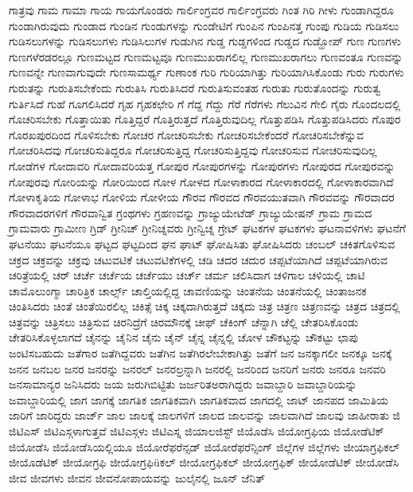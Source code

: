 {ಗಾತ್ರವು
ಗಾಮ
ಗಾಮಾ
ಗಾಯ
ಗಾಯಗೊಂಡರು
ಗಾರ್ಲಿಂಗ್ರವರ
ಗಾರ್ಲಿಂಗ್ರವರು
ಗಿಂತ
ಗಿರಿ
ಗೀಳು
ಗುಂಡಾಗಿದ್ದರೂ
ಗುಂಡಾಗಿರುವುದು
ಗುಂಡಾದ
ಗುಂಡಿನ
ಗುಂಡುಗಳನ್ನು
ಗುಂಡೇಟಿಗೆ
ಗುಂಪಿನ
ಗುಂಪಿನತ್ತ
ಗುಂಪು
ಗುಡಿಯ
ಗುಡಿಸಲು
ಗುಡಿಸಲುಗಳನ್ನು
ಗುಡಿಸಲುಗಳು
ಗುಡಿಸಿಲುಗಳ
ಗುಡುಗಿನ
ಗುಡ್ಡ
ಗುಡ್ಡಗಳಿಂದ
ಗುಡ್ಡದ
ಗುಡ್ಹೋಪ್
ಗುಣ
ಗುಣಗಳು
ಗುಣಗಳೆರಡರಲ್ಲೂ
ಗುಣಮಟ್ಟದ
ಗುಣಮಟ್ಟವೂ
ಗುಣಮುಖರಾಗಲಿಲ್ಲ
ಗುಣಮುಖರಾಗಲು
ಗುಣವಂತೂ
ಗುಣವನ್ನು
ಗುಣವನ್ನೇ
ಗುಣವಾಗುವುದೇ
ಗುಣಸಾಮರ್ಥ್ಯ
ಗುಣಾಂಕ
ಗುರಿ
ಗುರಿಯಾಗಿತ್ತು
ಗುರಿಯಾಗಿಸಿಕೊಂಡು
ಗುರು
ಗುರುಗಳು
ಗುರುತನ್ನು
ಗುರುತಿಸಬೇಕೆಂದು
ಗುರುತಿಸಿ
ಗುರುತಿಸಿದರೆ
ಗುರುತಿಸುವಂತಹ
ಗುರುತು
ಗುರುತೊಂದನ್ನು
ಗುರುತ್ವ
ಗುರ್ತಿಸಿದೆ
ಗುಹೆ
ಗೂಗಲಿಸಿದರೆ
ಗೃಹ
ಗೃಹಕಛೇರಿ
ಗೆ
ಗೆದ್ದ
ಗೆದ್ದು
ಗೆರೆ
ಗೆರೆಗಳು
ಗೆಲುವಿನ
ಗೇಲಿ
ಗೈರು
ಗೊಂದಲದಲ್ಲಿ
ಗೊಚರಿಸಬೇಕು
ಗೊತ್ತಾಯಿತು
ಗೊತ್ತಿದ್ದರೆ
ಗೊತ್ತಿರುತ್ತದೆ
ಗೊತ್ತಿರುವುದಿಲ್ಲ
ಗೊತ್ತುಪಡಿಸಿ
ಗೊತ್ತುಪಡಿಸಿದರು
ಗೊಪುರ
ಗೊರಖಪುರದಿಂದ
ಗೊಳಿಸಬೇಕು
ಗೋಚರ
ಗೋಚರಿಸಬೇಕು
ಗೋಚರಿಸಬೇಕೆಂದರೆ
ಗೋಚರಿಸಬೇಕೆನ್ನುವ
ಗೋಚರಿಸಿದವು
ಗೋಚರಿಸುತಿದ್ದರೂ
ಗೋಚರಿಸುತ್ತಿದ್ದ
ಗೋಚರಿಸುತ್ತಿದ್ದವು
ಗೋಚರಿಸುವ
ಗೋಚರಿಸುವುದಿಲ್ಲ
ಗೋಡೆಗಳ
ಗೋದಾವರಿ
ಗೋದಾವರಿಯತ್ತ
ಗೋಪುರ
ಗೋಪುರಗಳನ್ನು
ಗೋಪುರಗಳು
ಗೋಪುರದ
ಗೋಪುರವನ್ನು
ಗೋಪುರವು
ಗೋರಿಯನ್ನು
ಗೋರಿಯಿಂದ
ಗೋಳ
ಗೋಳದ
ಗೋಳಾಕಾರದ
ಗೋಳಾಕಾರದಲ್ಲಿ
ಗೋಳಾಕಾರವಾಗಿದೆ
ಗೋಳಾಕೃತಿಯ
ಗೋಳಾಭ
ಗೋಳಿಯ
ಗೋಳೀಯ
ಗೌರವ
ಗೌರವದ
ಗೌರವಯುತವಾಗಿ
ಗೌರವವನ್ನು
ಗೌರವಾದರ
ಗೌರವಾದರಗಳಿಗೆ
ಗೌರವಾನ್ವಿತ
ಗ್ರಂಥಗಳು
ಗ್ರಹಣವನ್ನು
ಗ್ರಾಜ್ಯುಯೇಟೆಡ್
ಗ್ರಾಜ್ಯುಯೇಷನ್
ಗ್ರಾಮ
ಗ್ರಾಮದ
ಗ್ರಾಮವಾರು
ಗ್ರಾಮೀಣ
ಗ್ರಿಡ್
ಗ್ರೀನಿಚ್
ಗ್ರೀನಿಚ್ನವರು
ಗ್ರೀನ್ವಿಚ್ನ
ಗ್ರೇಟ್
ಘಟಕಗಳ
ಘಟಕಗಳು
ಘಟನಾವಳಿಗಳು
ಘಟನೆಗೆ
ಘಟನೆಯು
ಘಟನೆಯೂ
ಘಟ್ಟದ
ಘಟ್ಟದಿಂದ
ಘನ
ಘಾಟ್
ಘೋಷಿಸಿತು
ಘೋಷಿಸಿದರು
ಚಂಬಲ್
ಚಕಿತಗೊಳಿಸುವ
ಚಕ್ರದ
ಚಕ್ರವನ್ನು
ಚಕ್ರವು
ಚಟುವಟಿಕೆ
ಚಟುವಟಿಕೆಗಳಲ್ಲಿ
ಚಡಿ
ಚದರ
ಚದುರ
ಚಪ್ಪಟೆಯಾಗಿದೆ
ಚಪ್ಪಟೆಯಾಗಿರುವ
ಚರಿತ್ರೆಯಲ್ಲಿ
ಚರ್
ಚರ್ಚೆ
ಚರ್ಚೆಯ
ಚರ್ಚೆಯು
ಚರ್ಚ್
ಚರ್ಮ
ಚಲಿಸಿದಾಗ
ಚಳಿಗಾಲ
ಚಳಿಯಲ್ಲಿ
ಚಾಟಿ
ಚಾಮೊಲುಂಗ್ಮಾ
ಚಾರಿತ್ರಿಕ
ಚಾರ್ಲ್ಸ್
ಚಾಲ್ತಿಯಲ್ಲಿದ್ದ
ಚಾವಣಿಯನ್ನು
ಚಿಂತನೆಯ
ಚಿಂತನೆಯಲ್ಲಿ
ಚಿಂತಾಜನಕ
ಚಿಂತಿಸಿದರು
ಚಿಂತೆ
ಚಿಂತೆಯಿರಲಿಲ್ಲ
ಚಿಕಿತ್ಸೆ
ಚಿಕ್ಕ
ಚಿಕ್ಕದಾಗಿರುತ್ತದೆ
ಚಿಕ್ಕದು
ಚಿತ್ರ
ಚಿತ್ರಣ
ಚಿತ್ರಣವನ್ನು
ಚಿತ್ರದ
ಚಿತ್ರದಲ್ಲಿ
ಚಿತ್ರವನ್ನು
ಚಿತ್ರಿಸಲು
ಚಿತ್ರಿಸುವ
ಚಿರನಿದ್ರೆಗೆ
ಚಿರಮೌನಕ್ಕೆ
ಚೀಫ್
ಚೆಕಿಂಗ್
ಚೆನ್ನಾಗಿ
ಚೆಲ್ಲಿ
ಚೇತರಿಸಿಕೊಂಡು
ಚೇತರಿಸಿಕೊಳ್ಳಲಾಗದೆ
ಚೈನನ್ನು
ಚೈನಿನ
ಚೈನು
ಚೈನ್
ಚೈನ್ನ
ಚೈನ್ನಲ್ಲಿ
ಚೋಳ
ಚೌಕಟ್ಟನ್ನು
ಚೌಕಟ್ಟು
ಛಾಪು
ಜಂಟಿಸಬಹುದು
ಜತೆಗಾರ
ಜತೆಗಿದ್ದವರು
ಜತೆಗಿನ
ಜತೆಗಿರಲೇಬೇಕಾಗಿತ್ತು
ಜತೆಗೆ
ಜನ
ಜನಕ್ಕಾಗಲೀ
ಜನಕ್ಕೂ
ಜನಕ್ಕೆ
ಜನನ
ಜನಬಲ
ಜನರ
ಜನರನ್ನು
ಜನರಲ್
ಜನರಲ್ರನ್ನಾಗಿ
ಜನರಲ್ಲಿ
ಜನರಿಂದ
ಜನರಿಗೆ
ಜನರು
ಜನರೂ
ಜನವರಿ
ಜನಸಾಮಾನ್ಯರ
ಜನಿಸಿದರು
ಜಯ
ಜರುಗಿಬಿಟ್ಟಿತು
ಜರ್ಜರಿತಅರಾಗಿದ್ದರು
ಜವಾಬ್ದಾರಿ
ಜವಾಬ್ದಾರಿಯನ್ನು
ಜವಾಬ್ದಾರಿಯಲ್ಲಿ
ಜಾಗ
ಜಾಗಕ್ಕೆ
ಜಾಗತಿಕ
ಜಾಗತಿಕವಾಗಿ
ಜಾಗತಿಕವಾದ
ಜಾಗದಲ್ಲಿ
ಜಾಟ್
ಜಾನಪದ
ಜಾಮಿತಿಯ
ಜಾರಿಗೆ
ಜಾರಿದ್ದರು
ಜಾರ್ಜ್
ಜಾಲ
ಜಾಲಕ್ಕೆ
ಜಾಲಗಳಿಗೆ
ಜಾಲದ
ಜಾಲವನ್ನು
ಜಾಲವಾಗಿದೆ
ಜಾಲವು
ಜಾಹೀರಾತು
ಜಿ
ಜಿಟಿಎಸ್
ಜಿಟಿಎಸ್ಗಳಾಗುತ್ತವೆ
ಜಿಟಿಎಸ್ಗಳು
ಜಿಟಿಎಸ್ನ
ಜಿಯಾಲಜಿಸ್ಟ್
ಜಿಯೊಡೆಸಿ
ಜಿಯೋಗ್ರಫಿಯ
ಜಿಯೋಡೆಟಿಕ್
ಜಿಯೋಡೆಸಿ
ಜಿಯೋಡೆಸಿಯಲ್ಲಿಯೂ
ಜಿಯೋರೆಫರೆನ್ಸಡ್
ಜಿಯೋರೆಫರೆನ್ಸಿಂಗ್
ಜಿಲ್ಲೆಗಳ
ಜಿಲ್ಲೆಗಳು
ಜೀಯಾಗ್ರಫಿಕಲ್
ಜೀಯೊಡೆಟಿಕ್
ಜೀಯೋಗ್ರಫಿ
ಜೀಯೋಗ್ರಫಿüಕಲ್
ಜೀಯೋಗ್ರಫಿಕಲ್
ಜೀಯೋಗ್ರಫಿಕ್
ಜೀಯೋಡೆಟಿಕ್
ಜೀಯೋಡೆಸಿ
ಜೀವ
ಜೀವಗಳು
ಜೀವನ
ಜೀವನೋಪಾಯವನ್ನು
ಜುಲೈನಲ್ಲಿ
ಜೂನ್
ಜೆನಿತ್
}
